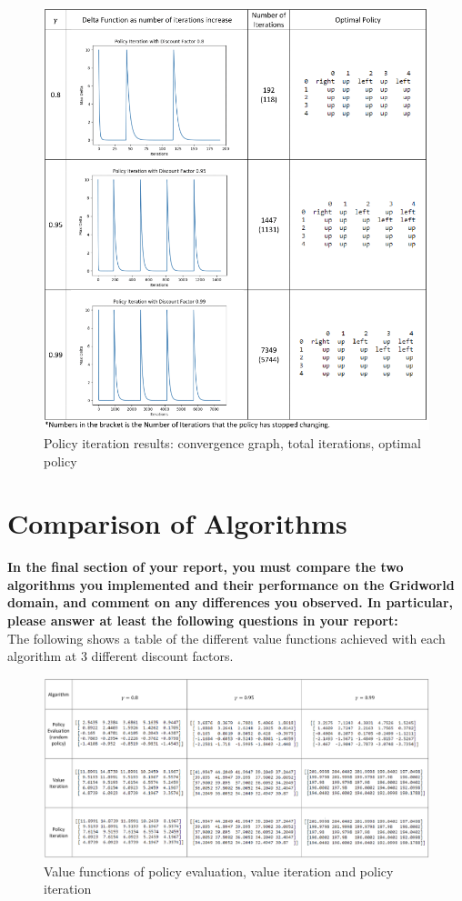 \documentclass[11pt]{article}
\begin{document}
\newpage
\begin{figure}[h]
\includegraphics[scale=0.5]{PI_chart}
\centering
\caption{Policy iteration results: convergence graph, total iterations, optimal policy}
\end{figure}


\newpage
\section{Comparison of Algorithms}
\textbf{In the final section of your report, you must compare the two algorithms you
implemented and their performance on the Gridworld domain, and comment on any
differences you observed. In particular, please answer at least the following
questions in your report:}
\\

\noindent
The following shows a table of the different value functions achieved with each algorithm at 
3 different discount factors.\\

\begin{figure}[h]
\includegraphics[scale=0.255]{value_functions}
\centering
\caption{Value functions of policy evaluation, value iteration and policy iteration}
\end{figure}
\end{document}
